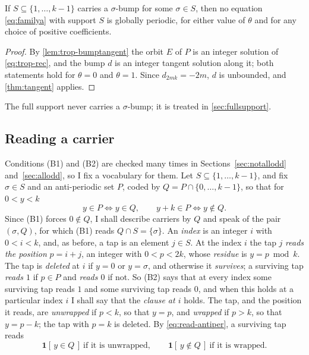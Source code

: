 \begin{theorem}
\label{thm:sigmabump}
If $S\subseteq\{1,\dots,k-1\}$ carries a $\sigma$-bump for some $\sigma\in S$, then no
equation \eqref{eq:familya} with support $S$ is globally periodic, for either value
of $\theta$ and for any choice of positive coefficients.
\end{theorem}

\begin{proof}
By \autoref{lem:trop-bumptangent} the orbit $E$ of $P$ is an integer solution of
\eqref{eq:trop-rec}, and the bump $d$ is an integer tangent solution along it;
both statements hold for $\theta=0$ and $\theta=1$. Since $d_{2mk}=-2m$, $d$ is unbounded, and \autoref{thm:tangent} applies.
\end{proof}

The full support never carries a $\sigma$-bump; it is treated in
\autoref{sec:fullsupport}.

\subsection{Reading a carrier}
\label{sec:nao-reading}

Conditions (B1) and (B2) are checked many times in
Sections~\ref{sec:notallodd} and~\ref{sec:allodd}, so I fix a vocabulary for
them. Let
$S\subseteq\{1,\dots,k-1\}$, and fix $\sigma\in S$ and an anti-periodic set $P$,
coded by $Q=P\cap\{0,\dots,k-1\}$, so that for $0<y<k$
\begin{equation}
y\in P\iff y\in Q,\qquad y+k\in P\iff y\notin Q .
\label{eq:read-antiper}
\end{equation}
Since (B1) forces $0\notin Q$, I shall describe carriers by $Q$ and speak of
the pair $(\sigma,Q)$, for which (B1) reads $Q\cap S=\{\sigma\}$.
An \emph{index} is an integer $i$ with $0<i<k$, and, as before, a tap is an element
$j\in S$. At the index $i$ the tap $j$ \emph{reads the position} $p=i+j$, an
integer with $0<p<2k$, whose \emph{residue} is $y=p\bmod k$. The tap is
\emph{deleted} at $i$ if $y=0$ or $y=\sigma$, and otherwise it
\emph{survives}; a surviving tap \emph{reads $1$} if $p\in P$ and
\emph{reads $0$} if not. So (B2) says that at every index some surviving tap
reads $1$ and some surviving tap reads $0$, and when this holds at a
particular index $i$ I shall say that the \emph{clause at $i$} holds. The tap,
and the position it reads, are \emph{unwrapped} if $p<k$, so that $y=p$, and
\emph{wrapped} if $p>k$, so that $y=p-k$; the tap with $p=k$ is deleted.
By \eqref{eq:read-antiper}, a
surviving tap reads
\begin{equation}
\mathbf 1[\,y\in Q\,]\ \text{if it is unwrapped},\qquad
\mathbf 1[\,y\notin Q\,]\ \text{if it is wrapped}.
\label{eq:read-reads}
\end{equation}

